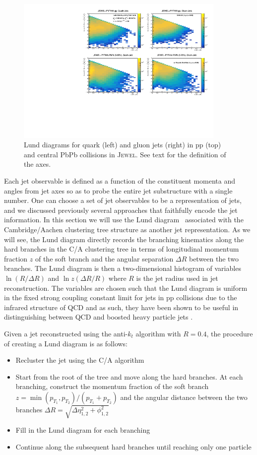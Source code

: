\documentclass[notoc,preprintnumbers]{JHEP3}
\begin{document}
\begin{figure}[t]
	\centering
	\includegraphics[width=0.9\textwidth]{plots/Individual_LundDiagrams_zrel.pdf}
	\caption{Lund diagrams for quark (left) and gluon jets (right) in pp (top) and central PbPb collisions in \textsc{Jewel}. See text for the definition of the axes.}
\label{fig:Lund_full}
\end{figure}

Each jet observable is defined as a function of the constituent momenta and angles from jet axes so as to probe the entire jet substructure with a single number. One can choose a set of jet observables to be a representation of jets, and we discussed previously several approaches that faithfully encode the jet information. In this section we will use the Lund diagram~\cite{Andersson1989} associated with the Cambridge/Aachen clustering tree structure as another jet representation. As we will see, the Lund diagram directly records the branching kinematics along the hard branches in the C/A clustering tree in terms of longitudinal momentum fraction $z$ of the soft branch and the angular separation $\Delta R$ between the two branches. The Lund diagram is then a two-dimensional histogram of variables $\ln (R/\Delta R)$ and $\ln z(\Delta R/R)$ where $R$ is the jet radius used in jet reconstruction. The variables are chosen such that the Lund diagram is uniform in the fixed strong coupling constant limit for jets in pp collisions due to the infrared structure of QCD and as such, they have been shown to be useful in distinguishing between QCD and boosted heavy particle jets \cite{Salam:2016yht}.

Given a jet reconstructed using the anti-$k_{t}$ algorithm with $R = 0.4$, the procedure of creating a Lund diagram is as follows:
\begin{itemize}
	\item Recluster the jet using the C/A algorithm
	\item Start from the root of the tree and move along the hard branches. At each branching, construct the momentum fraction of the soft branch $z=\min(p_{T_1},p_{T_2})/(p_{T_1}+p_{T_2})$ and the angular distance between the two branches $\Delta R = \sqrt{\Delta \eta^2_{1, 2}+\phi^2_{1, 2}}$
	\item Fill in the Lund diagram for each branching
	\item Continue along the subsequent hard branches until reaching only one particle
\end{itemize}
\end{document}
